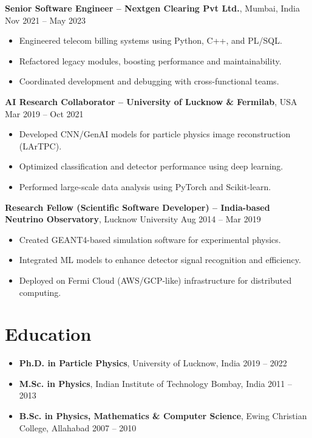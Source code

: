 \documentclass[a4paper,10pt]{article}
\begin{document}
\textbf{Senior Software Engineer – Nextgen Clearing Pvt Ltd.}, Mumbai, India \hfill Nov 2021 – May 2023
\begin{itemize}[leftmargin=0.5cm]
  \item Engineered telecom billing systems using Python, C++, and PL/SQL.
  \item Refactored legacy modules, boosting performance and maintainability.
  \item Coordinated development and debugging with cross-functional teams.
\end{itemize}

\textbf{AI Research Collaborator – University of Lucknow \& Fermilab}, USA \hfill Mar 2019 – Oct 2021
\begin{itemize}[leftmargin=0.5cm]
  \item Developed CNN/GenAI models for particle physics image reconstruction (LArTPC).
  \item Optimized classification and detector performance using deep learning.
  \item Performed large-scale data analysis using PyTorch and Scikit-learn.
\end{itemize}

\textbf{Research Fellow (Scientific Software Developer) – India-based Neutrino Observatory}, Lucknow University \hfill Aug 2014 – Mar 2019
\begin{itemize}[leftmargin=0.5cm]
  \item Created GEANT4-based simulation software for experimental physics.
  \item Integrated ML models to enhance detector signal recognition and efficiency.
  \item Deployed on Fermi Cloud (AWS/GCP-like) infrastructure for distributed computing.
\end{itemize}

\section{Education}
\begin{itemize}[leftmargin=0.5cm]
  \item \textbf{Ph.D. in Particle Physics}, University of Lucknow, India \hfill 2019 – 2022
  \item \textbf{M.Sc. in Physics}, Indian Institute of Technology Bombay, India \hfill 2011 – 2013
  \item \textbf{B.Sc. in Physics, Mathematics \& Computer Science}, Ewing Christian College, Allahabad \hfill 2007 – 2010
\end{itemize}
\end{document}
